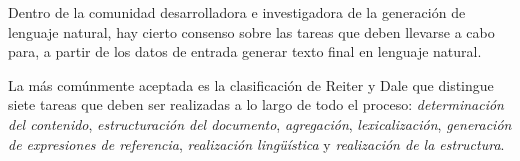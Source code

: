 Dentro de la comunidad desarrolladora e investigadora de la generación de lenguaje natural, hay cierto consenso sobre las tareas que deben llevarse a cabo para, a partir de los datos de entrada generar texto final en lenguaje natural. 

La más comúnmente aceptada es la clasificación de Reiter y Dale que distingue siete tareas que deben ser realizadas a lo largo de todo el proceso: \emph{determinación del contenido}, \emph{estructuración del documento}, \emph{agregación}, \emph{lexicalización}, \emph{generación de expresiones de referencia}, \emph{realización lingüística} y \emph{realización de la estructura}.

\begin{comment}
\textbf{Determinación del contenido:} es el proceso de determinar que información debe ser comunicada en el texto final. 

\textbf{Estructuración del documento:} es el proceso de imponer un orden y estructura sobre los textos generados. 

\textbf{Agregación:} Es el proceso de agrupar mensajes para formar nuevas frases.

\textbf{Lexicalización:} Es el proceso de decidir que palabras y frases especificas usar para expresar los distintos conceptos y relaciones del dominio.

\textbf{Generación de expresiones de referencia:} es la tarea de elegir que palabras y frases usar para identificar entidades del dominio de aplicación.

\textbf{Realización lingüística:} es el proceso de aplicar reglas gramaticales para producir texto que sea sintáctica, morfológica y ortográficamente correcto.

\textbf{Realización de la estructura:} es la tarea de convertir estructuras abstractas, como párrafos y secciones, en símbolos marcados comprensibles por el componente de presentación del documento.

Hay varias cuestiones que deben abordarse para poder producir un texto a partir de una entrada dada. Reiter y Dale\cite{reiterdale} proponen descomponer este proceso en tres módulos conceptuales: \emph{``documment planning''}, \emph{``microplanning''} y \emph{``realization''}. Y en una categorización más fina se puede dividir el procesamiento realizado por estos módulos en termino de tareas de \emph{determinación de contenido}, \emph{estructuración del documento}, \emph{lexicalización}, \emph{agregación}, \emph{generación de expresiones de referencia}, \emph{realización lingüística} y \emph{realización de estructura}.


\end{comment}
